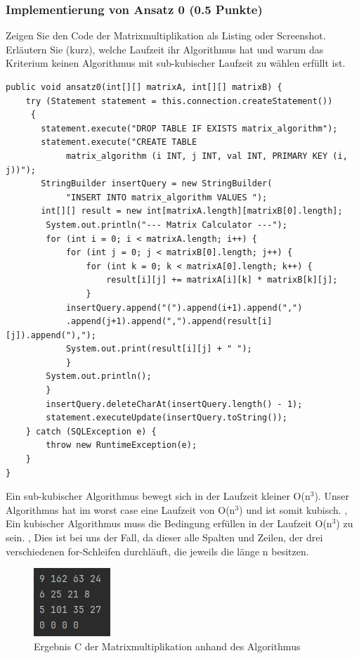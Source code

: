 \documentclass[11pt]{scrartcl}
\begin{document}
\subsubsection*{Implementierung von Ansatz 0 (0.5 Punkte)}

Zeigen Sie den Code der Matrixmultiplikation als Listing oder Screenshot.
Erläutern Sie (kurz), welche Laufzeit ihr Algorithmus hat und warum das Kriterium keinen Algorithmus mit sub-kubischer Laufzeit zu wählen erfüllt ist.

\begin{lstlisting}[style=dmrJava]
public void ansatz0(int[][] matrixA, int[][] matrixB) {
    try (Statement statement = this.connection.createStatement())
     {
       statement.execute("DROP TABLE IF EXISTS matrix_algorithm");
       statement.execute("CREATE TABLE 
            matrix_algorithm (i INT, j INT, val INT, PRIMARY KEY (i, j))");
       StringBuilder insertQuery = new StringBuilder(
            "INSERT INTO matrix_algorithm VALUES ");
       int[][] result = new int[matrixA.length][matrixB[0].length];
        System.out.println("--- Matrix Calculator ---");
        for (int i = 0; i < matrixA.length; i++) {
            for (int j = 0; j < matrixB[0].length; j++) {
                for (int k = 0; k < matrixA[0].length; k++) {
                    result[i][j] += matrixA[i][k] * matrixB[k][j];
                }
            insertQuery.append("(").append(i+1).append(",")
            .append(j+1).append(",").append(result[i][j]).append("),");
            System.out.print(result[i][j] + " ");
            }
        System.out.println();
        }
        insertQuery.deleteCharAt(insertQuery.length() - 1);
        statement.executeUpdate(insertQuery.toString());
    } catch (SQLException e) {
        throw new RuntimeException(e);
    }
}
\end{lstlisting}

Ein sub-kubischer Algorithmus bewegt sich in der Laufzeit kleiner O(n$^{3}$).
Unser Algorithmus hat im worst case eine Laufzeit von O(n$^{3}$) und ist somit kubisch. \cite{MatrixMultiplikation},
Ein kubischer Algorithmus muss die Bedingung erfüllen in der Laufzeit O(n$^{3}$) zu sein. \cite{Kubischer},
Dies ist bei uns der Fall, da dieser alle Spalten und Zeilen, der drei verschiedenen for-Schleifen durchläuft, die jeweils die länge n besitzen.

\begin{figure}[H]
    \begin{center}
        \includegraphics{matrix_algorithm.jpg}
        \caption{Ergebnis C der Matrixmultiplikation anhand des Algorithmus}
    \end{center}
 \end{figure}
\end{document}
